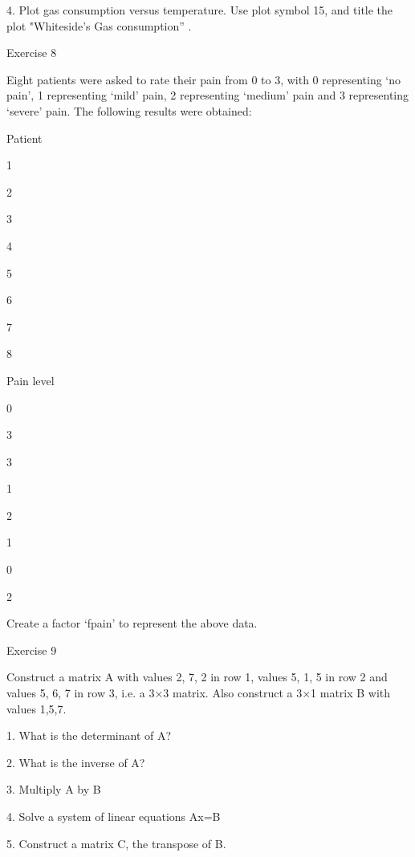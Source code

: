 4.
Plot gas consumption versus temperature. Use plot symbol 15, and title the plot "Whiteside’s Gas consumption” .


 

Exercise 8

 

Eight patients were asked to rate their pain from 0 to 3, with 0 representing `no pain', 1 representing `mild' pain, 2 representing `medium' pain and 3 representing `severe' pain. The following results were obtained:

 















Patient
 

1
 

2
 

3
 

4
 

5
 

6
 

7
 

8
 



Pain level
 

0
 

3
 

3
 

1
 

2
 

1
 

0
 

2
 

 

Create a factor ‘fpain’ to represent the above data.

 

Exercise 9

 

Construct a matrix A with values 2, 7, 2 in row 1, values 5, 1, 5 in row 2 and values 5, 6, 7 in row 3, i.e. a 3×3 matrix. Also construct a  3×1 matrix B with values 1,5,7. 

 
1.
What is the determinant of A?

2.
What is the inverse of A?

3.
Multiply A by B

4.
Solve a system of linear equations Ax=B

5.
Construct a matrix C, the transpose of B.

